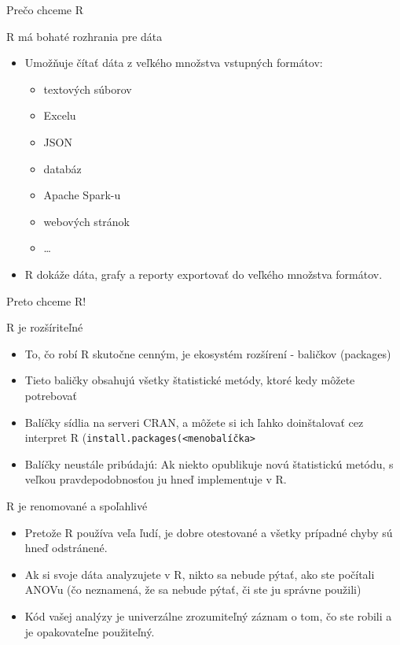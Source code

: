 \begin{frame}{Prečo chceme R}
	\begin{block}{R má bohaté rozhrania pre dáta}
		\begin{itemize}
			\item Umožňuje čítať dáta z veľkého množstva vstupných formátov:
			\begin{itemize}
				\item textových súborov
				\item Excelu
				\item JSON
				\item databáz
				\item Apache Spark-u
				\item webových stránok
				\item \dots
			\end{itemize}
			\item R dokáže dáta, grafy a reporty exportovať do veľkého množstva formátov.
		\end{itemize}
	\end{block}
\end{frame}

\begin{frame}{Preto chceme R!}
	\begin{block}{R je rozšíriteľné}
		\begin{itemize}
			\item To, čo robí R skutočne cenným, je ekosystém rozšírení - baličkov (packages)
			\item Tieto baličky obsahujú všetky štatistické metódy, ktoré kedy môžete potrebovať 
			\item Balíčky sídlia na serveri CRAN, a môžete si ich ľahko doinštalovať cez interpret R (\texttt{install.packages(<menobalíčka>}
			\item Balíčky neustále pribúdajú: Ak niekto opublikuje novú štatistickú metódu, s veľkou pravdepodobnosťou ju hneď implementuje v R.
		\end{itemize}
	\end{block}
	\begin{block}{R je renomované a spoľahlivé}
		\begin{itemize}
			\item Pretože R používa veľa ľudí, je dobre otestované a všetky prípadné chyby sú hneď odstránené.
			\item Ak si svoje dáta analyzujete v R, nikto sa nebude pýtať, ako ste počítali ANOVu (čo neznamená, že sa nebude pýtať, či ste ju správne použili)
			\item Kód vašej analýzy je univerzálne zrozumiteľný záznam o tom, čo ste robili a je opakovateľne použiteľný.
		\end{itemize}
	\end{block}
\end{frame}

